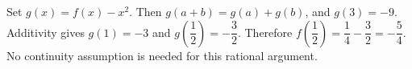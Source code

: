 Set $ g(x)=f(x)-x^2 $. Then $ g(a+b)=g(a)+g(b)$, and $ g(3)=-9 $. Additivity gives $ g(1)=-3 $ and $ g(\dfrac{1}{2})=-\dfrac{3}{2}$. Therefore $ f(\dfrac{1}{2})=\dfrac{1}{4}-\dfrac{3}{2}=\boxed{-\dfrac{5}{4}}$. No continuity assumption is needed for this rational argument.
